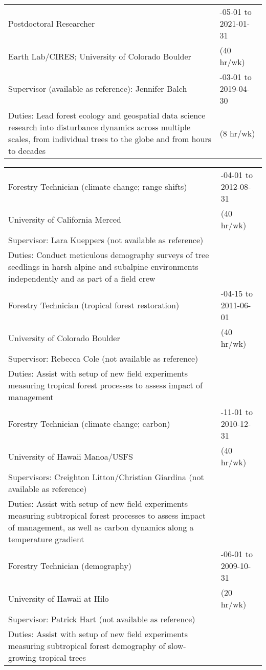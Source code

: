\documentclass[10pt,english]{article}
\providecommand{\tabularnewline}{\\}
\begin{document}
\begin{tabularx}{\textwidth}{@{}>{\raggedright}p{4.5in} >{\raggedleft}X@{}}
Postdoctoral Researcher & 2019-05-01 to 2021-01-31 \tabularnewline
\addtolength{\leftskip}{5ex}Earth Lab/CIRES; University of Colorado Boulder & (40 hr/wk) \tabularnewline
\addtolength{\leftskip}{5ex}Supervisor (available as reference): Jennifer Balch & 2019-03-01 to 2019-04-30 \tabularnewline
\addtolength{\leftskip}{5ex}Duties: Lead forest ecology and geospatial data science research into disturbance dynamics across multiple scales, from individual trees to the globe and from hours to decades & (8 hr/wk) \tabularnewline

\end{tabularx}

\renewcommand{\arraystretch}{1.2}
\begin{tabularx}{\textwidth}{@{}>{\raggedright}p{4.5in} >{\raggedleft}X@{}}

Forestry Technician (climate change; range shifts) & 2012-04-01 to 2012-08-31 \tabularnewline
\addtolength{\leftskip}{5ex}University of California Merced & (40 hr/wk) \tabularnewline
\addtolength{\leftskip}{5ex}Supervisor: Lara Kueppers (not available as reference) & \tabularnewline
\addtolength{\leftskip}{5ex}Duties: Conduct meticulous demography surveys of tree seedlings in harsh alpine and subalpine environments independently and as part of a field crew  & \tabularnewline

Forestry Technician (tropical forest restoration) & 2011-04-15 to 2011-06-01 \tabularnewline
\addtolength{\leftskip}{5ex} University of Colorado Boulder & (40 hr/wk) \tabularnewline
\addtolength{\leftskip}{5ex}Supervisor: Rebecca Cole (not available as reference) & \tabularnewline
\addtolength{\leftskip}{5ex}Duties: Assist with setup of new field experiments measuring tropical forest processes to assess impact of management & \tabularnewline

Forestry Technician (climate change; carbon) & 2009-11-01 to 2010-12-31 \tabularnewline
\addtolength{\leftskip}{5ex} University of Hawaii Manoa/USFS & (40 hr/wk) \tabularnewline
\addtolength{\leftskip}{5ex}Supervisors: Creighton Litton/Christian Giardina (not available as reference) & \tabularnewline
\addtolength{\leftskip}{5ex}Duties: Assist with setup of new field experiments measuring subtropical forest processes to assess impact of management, as well as carbon dynamics along a temperature gradient & \tabularnewline

Forestry Technician (demography) & 2009-06-01 to 2009-10-31 \tabularnewline
\addtolength{\leftskip}{5ex} University of Hawaii at Hilo & (20 hr/wk) \tabularnewline
\addtolength{\leftskip}{5ex}Supervisor: Patrick Hart (not available as reference) & \tabularnewline
\addtolength{\leftskip}{5ex}Duties: Assist with setup of new field experiments measuring subtropical forest demography of slow-growing tropical trees & \tabularnewline


\end{tabularx}
\end{document}
